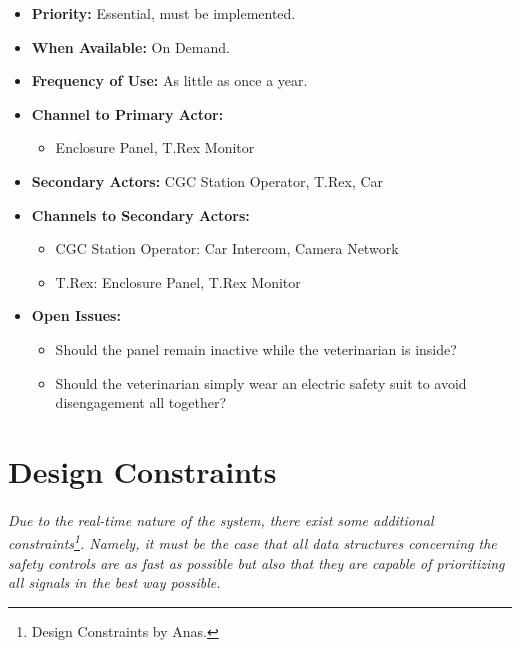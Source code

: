 \documentclass[12pt]{article}
\begin{document}
\begin{itemize}
        \item[]\textbf{Priority:}
            Essential, must be implemented.

        \item[]\textbf{When Available:}
            On Demand.

        \item[]\textbf{Frequency of Use:}
            As little as once a year.

        \item[]\textbf{Channel to Primary Actor:}
            \begin{itemize}
                \item[] Enclosure Panel, T.Rex Monitor
            \end{itemize}

        \item[]\textbf{Secondary Actors:}
            CGC Station Operator, T.Rex, Car
        
        \item[]\textbf{Channels to Secondary Actors:}
            \begin{itemize}
                \item[] CGC Station Operator: Car Intercom, Camera Network
                \item[] T.Rex: Enclosure Panel, T.Rex Monitor
            \end{itemize}

        \item[]\textbf{Open Issues:}
            \begin{itemize}
                \item[] Should the panel remain inactive while 
                the veterinarian is inside?
                \item[] Should the veterinarian simply wear an electric 
                safety suit to avoid disengagement all together?
            \end{itemize}
    \end{itemize}
    
\section{Design Constraints} \label{cons}
\paragraph{} \textit{Due to the real-time nature of the system, there exist some additional 
constraints\footnote{Design Constraints by Anas.}. Namely, it must be the case that all data 
structures concerning the safety controls are as fast as possible but also that they are capable 
of prioritizing all signals in the best way possible.}
\end{document}
